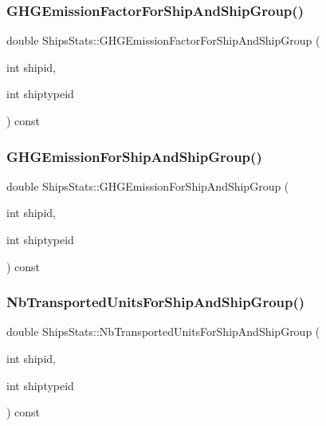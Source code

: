 \mbox{\label{class_ships_stats_a9d7a465c47494fc96b4e934ba6d1c38e}} 
\subsubsection{\texorpdfstring{GHGEmissionFactorForShipAndShipGroup()}{GHGEmissionFactorForShipAndShipGroup()}}
{\footnotesize\ttfamily double Ships\+Stats\+::\+G\+H\+G\+Emission\+Factor\+For\+Ship\+And\+Ship\+Group (\begin{DoxyParamCaption}\item[{int}]{shipid,  }\item[{int}]{shiptypeid }\end{DoxyParamCaption}) const}

\mbox{\label{class_ships_stats_aa63c88ca2fae2f070101a0225ac6e4ef}} 
\subsubsection{\texorpdfstring{GHGEmissionForShipAndShipGroup()}{GHGEmissionForShipAndShipGroup()}}
{\footnotesize\ttfamily double Ships\+Stats\+::\+G\+H\+G\+Emission\+For\+Ship\+And\+Ship\+Group (\begin{DoxyParamCaption}\item[{int}]{shipid,  }\item[{int}]{shiptypeid }\end{DoxyParamCaption}) const}

\mbox{\label{class_ships_stats_a20319bb36a031c08949a47aa33548c44}} 
\subsubsection{\texorpdfstring{NbTransportedUnitsForShipAndShipGroup()}{NbTransportedUnitsForShipAndShipGroup()}}
{\footnotesize\ttfamily double Ships\+Stats\+::\+Nb\+Transported\+Units\+For\+Ship\+And\+Ship\+Group (\begin{DoxyParamCaption}\item[{int}]{shipid,  }\item[{int}]{shiptypeid }\end{DoxyParamCaption}) const}

